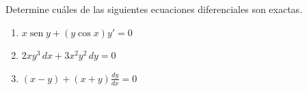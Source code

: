 \item Determine cuáles de las siguientes ecuaciones diferenciales son exactas.
    \begin{enumerate}
        \item[(a)] $x \operatorname{sen} y + (y \cos x)y' = 0$
        \item[(b)] $2xy^3 \, dx + 3x^2y^2 \, dy = 0$
        \item[(c)] $(x - y) + (x + y) \frac{dy}{dx} = 0$
    \end{enumerate}
